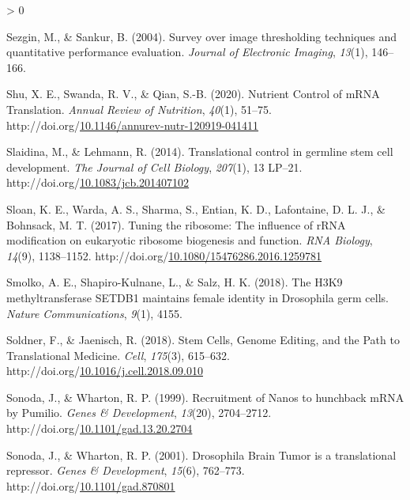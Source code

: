 \documentclass[12pt,oneside]{reedthesis}
\newlength{\cslhangindent}
\newenvironment{CSLReferences}[2] %
 {%
  \setlength{\parindent}{0pt}
  \ifodd #1 \everypar{\setlength{\hangindent}{\cslhangindent}}\ignorespaces\fi
  \ifnum #2 > 0
  \setlength{\parskip}{#2\baselineskip}
  \fi
 }%
 {}
\begin{document}
\begin{CSLReferences}{1}{0}
\leavevmode\hypertarget{ref-sezginSurveyImageThresholding2004}{}%
Sezgin, M., \& Sankur, B. (2004). Survey over image thresholding techniques and quantitative performance evaluation. \emph{Journal of Electronic Imaging}, \emph{13}(1), 146--166.

\leavevmode\hypertarget{ref-shuNutrientControlMRNA2020}{}%
Shu, X. E., Swanda, R. V., \& Qian, S.-B. (2020). Nutrient {Control} of {mRNA Translation}. \emph{Annual Review of Nutrition}, \emph{40}(1), 51--75. http://doi.org/\href{https://doi.org/10.1146/annurev-nutr-120919-041411}{10.1146/annurev-nutr-120919-041411}

\leavevmode\hypertarget{ref-Slaidina2014h}{}%
Slaidina, M., \& Lehmann, R. (2014). Translational control in germline stem cell development. \emph{The Journal of Cell Biology}, \emph{207}(1), 13 LP--21. http://doi.org/\href{https://doi.org/10.1083/jcb.201407102}{10.1083/jcb.201407102}

\leavevmode\hypertarget{ref-Sloan2017e}{}%
Sloan, K. E., Warda, A. S., Sharma, S., Entian, K. D., Lafontaine, D. L. J., \& Bohnsack, M. T. (2017). Tuning the ribosome: {The} influence of {rRNA} modification on eukaryotic ribosome biogenesis and function. \emph{RNA Biology}, \emph{14}(9), 1138--1152. http://doi.org/\href{https://doi.org/10.1080/15476286.2016.1259781}{10.1080/15476286.2016.1259781}

\leavevmode\hypertarget{ref-Smolko2018}{}%
Smolko, A. E., Shapiro-Kulnane, L., \& Salz, H. K. (2018). The {H3K9} methyltransferase {SETDB1} maintains female identity in {Drosophila} germ cells. \emph{Nature Communications}, \emph{9}(1), 4155.

\leavevmode\hypertarget{ref-Soldner2018d}{}%
Soldner, F., \& Jaenisch, R. (2018). Stem {Cells}, {Genome Editing}, and the {Path} to {Translational Medicine}. \emph{Cell}, \emph{175}(3), 615--632. http://doi.org/\href{https://doi.org/10.1016/j.cell.2018.09.010}{10.1016/j.cell.2018.09.010}

\leavevmode\hypertarget{ref-Sonoda1999a}{}%
Sonoda, J., \& Wharton, R. P. (1999). Recruitment of {Nanos} to hunchback {mRNA} by {Pumilio}. \emph{Genes \& Development}, \emph{13}(20), 2704--2712. http://doi.org/\href{https://doi.org/10.1101/gad.13.20.2704}{10.1101/gad.13.20.2704}

\leavevmode\hypertarget{ref-Sonoda2001d}{}%
Sonoda, J., \& Wharton, R. P. (2001). Drosophila {Brain Tumor} is a translational repressor. \emph{Genes \& Development}, \emph{15}(6), 762--773. http://doi.org/\href{https://doi.org/10.1101/gad.870801}{10.1101/gad.870801}


\end{CSLReferences}
\end{document}
